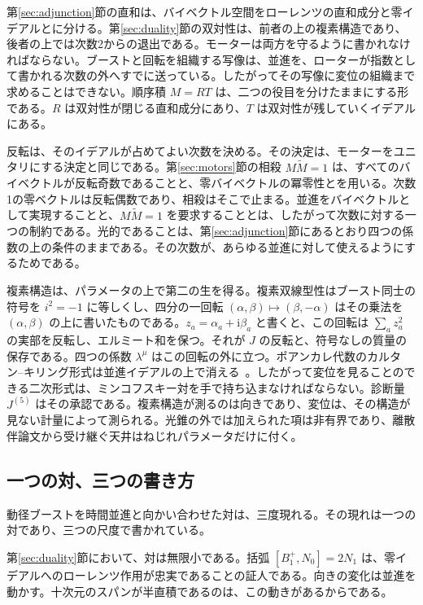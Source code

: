 \documentclass[a4paper]{article}
\begin{document}
第\ref{sec:adjunction}節の直和は、バイベクトル空間をローレンツの直和成分と零イデアルとに分ける。第\ref{sec:duality}節の双対性は、前者の上の複素構造であり、後者の上では次数2からの退出である。モーターは両方を守るように書かれなければならない。ブーストと回転を組織する写像は、並進を、ローターが指数として書かれる次数の外へすでに送っている。したがってその写像に変位の組織まで求めることはできない。順序積 \(M=RT\) は、二つの役目を分けたままにする形である。\(R\) は双対性が閉じる直和成分にあり、\(T\) は双対性が残していくイデアルにある。

反転は、そのイデアルが占めてよい次数を決める。その決定は、モーターをユニタリにする決定と同じである。第\ref{sec:motors}節の相殺 \(M\widetilde{M}=1\) は、すべてのバイベクトルが反転奇数であることと、零バイベクトルの冪零性とを用いる。次数1の零ベクトルは反転偶数であり、相殺はそこで止まる。並進をバイベクトルとして実現することと、\(M\widetilde{M}=1\) を要求することとは、したがって次数に対する一つの制約である。光的であることは、第\ref{sec:adjunction}節にあるとおり四つの係数の上の条件のままである。その次数が、あらゆる並進に対して使えるようにするためである。

複素構造は、パラメータの上で第二の生を得る。複素双線型性はブースト同士の符号を \(i^{2}=-1\) に等しくし、四分の一回転 \((\alpha,\beta)\mapsto(\beta,-\alpha)\) はその乗法を \((\alpha,\beta)\) の上に書いたものである。\(z_{a}=\alpha_{a}+\mathrm{i}\beta_{a}\) と書くと、この回転は \(\sum_{a}z_{a}^{2}\) の実部を反転し、エルミート和を保つ。それが \(J\) の反転と、符号なしの質量の保存である。四つの係数 \(\lambda^{\mu}\) はこの回転の外に立つ。ポアンカレ代数のカルタン--キリング形式は並進イデアルの上で消える~\cite{FultonHarris1991,Humphreys1972}。したがって変位を見ることのできる二次形式は、ミンコフスキー対を手で持ち込まなければならない。診断量 \(J^{(5)}\) はその承認である。複素構造が測るのは向きであり、変位は、その構造が見ない計量によって測られる。光錐の外では加えられた項は非有界であり、離散伴論文から受け継ぐ天井はねじれパラメータだけに付く。

\subsection{一つの対、三つの書き方}

動径ブーストを時間並進と向かい合わせた対は、三度現れる。その現れは一つの対であり、三つの尺度で書かれている。

第\ref{sec:duality}節において、対は無限小である。括弧 \([B^{+}_{1},N_{0}]=2N_{1}\) は、零イデアルへのローレンツ作用が忠実であることの証人である。向きの変化は並進を動かす。十次元のスパンが半直積であるのは、この動きがあるからである。
\end{document}
